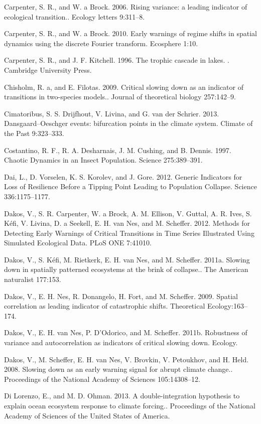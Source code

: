 \documentclass{article}
\begin{document}
Carpenter, S. R., and W. a Brock. 2006. Rising variance: a leading
indicator of ecological transition.. Ecology letters 9:311--8.

Carpenter, S. R., and W. a Brock. 2010. Early warnings of regime shifts
in spatial dynamics using the discrete Fourier transform. Ecosphere
1:10.

Carpenter, S. R., and J. F. Kitchell. 1996. The trophic cascade in
lakes. . Cambridge University Press.

Chisholm, R. a, and E. Filotas. 2009. Critical slowing down as an
indicator of transitions in two-species models.. Journal of theoretical
biology 257:142--9.

Cimatoribus, S. S. Drijfhout, V. Livina, and G. van der Schrier. 2013.
Dansgaard--Oeschger events: bifurcation points in the climate system.
Climate of the Past 9:323--333.

Costantino, R. F., R. A. Desharnais, J. M. Cushing, and B. Dennis. 1997.
Chaotic Dynamics in an Insect Population. Science 275:389--391.

Dai, L., D. Vorselen, K. S. Korolev, and J. Gore. 2012. Generic
Indicators for Loss of Resilience Before a Tipping Point Leading to
Population Collapse. Science 336:1175--1177.

Dakos, V., S. R. Carpenter, W. a Brock, A. M. Ellison, V. Guttal, A. R.
Ives, S. Kéfi, V. Livina, D. a Seekell, E. H. van Nes, and M. Scheffer.
2012. Methods for Detecting Early Warnings of Critical Transitions in
Time Series Illustrated Using Simulated Ecological Data. PLoS ONE
7:41010.

Dakos, V., S. Kéfi, M. Rietkerk, E. H. van Nes, and M. Scheffer. 2011a.
Slowing down in spatially patterned ecosystems at the brink of
collapse.. The American naturalist 177:153.

Dakos, V., E. H. Nes, R. Donangelo, H. Fort, and M. Scheffer. 2009.
Spatial correlation as leading indicator of catastrophic shifts.
Theoretical Ecology:163--174.

Dakos, V., E. H. van Nes, P. D'Odorico, and M. Scheffer. 2011b.
Robustness of variance and autocorrelation as indicators of critical
slowing down. Ecology.

Dakos, V., M. Scheffer, E. H. van Nes, V. Brovkin, V. Petoukhov, and H.
Held. 2008. Slowing down as an early warning signal for abrupt climate
change.. Proceedings of the National Academy of Sciences 105:14308--12.

Di Lorenzo, E., and M. D. Ohman. 2013. A double-integration hypothesis
to explain ocean ecosystem response to climate forcing.. Proceedings of
the National Academy of Sciences of the United States of America.
\end{document}
